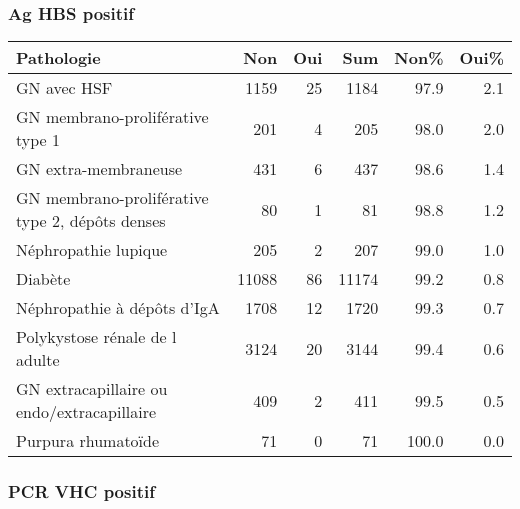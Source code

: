\documentclass[11pt,a4paper]{article}\usepackage[]{graphicx}\usepackage[]{color}
\begin{document}
\subsubsection*{Ag HBS positif}

\begin{table}[H]
\centering
\begin{tabular}{lrrrrr}
  \hline
Pathologie & Non & Oui & Sum & Non\% & Oui\% \\ 
  \hline
GN avec HSF & 1159 & 25 & 1184 & 97.9 & 2.1 \\ 
  GN membrano-proliférative type 1 & 201 &  4 & 205 & 98.0 & 2.0 \\ 
  GN extra-membraneuse & 431 &  6 & 437 & 98.6 & 1.4 \\ 
  GN membrano-proliférative type 2, dépôts denses & 80 &  1 & 81 & 98.8 & 1.2 \\ 
  Néphropathie lupique & 205 &  2 & 207 & 99.0 & 1.0 \\ 
  Diabète & 11088 & 86 & 11174 & 99.2 & 0.8 \\ 
  Néphropathie à dépôts d'IgA & 1708 & 12 & 1720 & 99.3 & 0.7 \\ 
  Polykystose rénale de l adulte & 3124 & 20 & 3144 & 99.4 & 0.6 \\ 
  GN extracapillaire ou endo/extracapillaire & 409 &  2 & 411 & 99.5 & 0.5 \\ 
  Purpura rhumatoïde & 71 &  0 & 71 & 100.0 & 0.0 \\ 
   \hline
\end{tabular}
\end{table}


\subsubsection*{PCR VHC positif}
\end{document}
